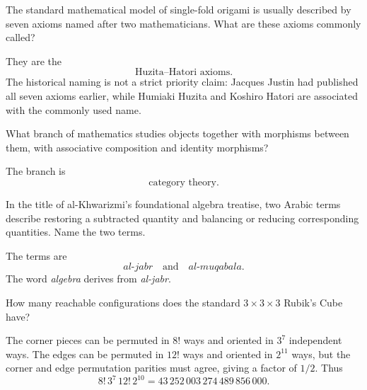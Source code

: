     \begin{expectedproblem}
        The standard mathematical model of single-fold origami is usually
        described by seven axioms named after two mathematicians. What are
        these axioms commonly called?
    \end{expectedproblem}

    \begin{solution}
        They are the
        \[
            \boxed{\text{Huzita--Hatori axioms}}.
        \]
        The historical naming is not a strict priority claim: Jacques Justin
        had published all seven axioms earlier, while Humiaki Huzita and
        Koshiro Hatori are associated with the commonly used name.
    \end{solution}

    \begin{expectedproblem}
        What branch of mathematics studies objects together with morphisms
        between them, with associative composition and identity morphisms?
    \end{expectedproblem}

    \begin{solution}
        The branch is
        \[
            \boxed{\text{category theory}}.
        \]
    \end{solution}

    \begin{expectedproblem}
        In the title of al-Khwarizmi's foundational algebra treatise, two Arabic
        terms describe restoring a subtracted quantity and balancing or
        reducing corresponding quantities. Name the two terms.
    \end{expectedproblem}

    \begin{solution}
        The terms are
        \[
            \boxed{\textit{al-jabr}\quad\text{and}\quad\textit{al-muqabala}}.
        \]
        The word \emph{algebra} derives from \emph{al-jabr}.
    \end{solution}

    \begin{expectedproblem}
        How many reachable configurations does the standard $3\times3\times3$
        Rubik's Cube have?
    \end{expectedproblem}

    \begin{solution}
        The corner pieces can be permuted in $8!$ ways and oriented in $3^7$
        independent ways. The edges can be permuted in $12!$ ways and oriented
        in $2^{11}$ ways, but the corner and edge permutation parities must
        agree, giving a factor of $1/2$. Thus
        \[
            8!\,3^7\,12!\,2^{10}
            =
            \boxed{43\,252\,003\,274\,489\,856\,000}.
        \]
    \end{solution}

